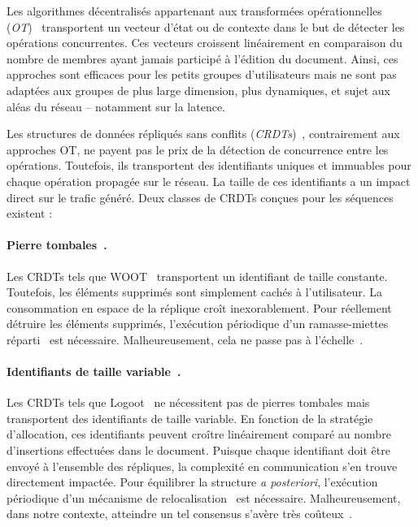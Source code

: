 Les algorithmes décentralisés appartenant aux transformées opérationnelles
(\emph{OT})~\cite{sun1998operational, sun2009contextbased} transportent un
vecteur d'état ou de contexte dans le but de détecter les opérations
concurrentes. Ces vecteurs croissent linéairement en comparaison du nombre de
membres ayant jamais participé à l'édition du document. Ainsi, ces approches
sont efficaces pour les petits groupes d'utilisateurs mais ne sont pas adaptées
aux groupes de plus large dimension, plus dynamiques, et sujet aux aléas du
réseau -- notamment sur la latence.

Les structures de données répliqués sans conflits
(\emph{CRDTs})~\cite{burckhardt2014replicated, shapiro2011comprehensive,
shapiro2011conflict}, contrairement aux approches OT, ne payent pas le prix de
la détection de concurrence entre les opérations. Toutefois, ils transportent
des identifiants uniques et immuables pour chaque opération propagée sur le
réseau. La taille de ces identifiants a un impact direct sur le trafic généré.
Deux classes de CRDTs conçues pour les séquences existent :

\paragraph{Pierre tombales~\cite{ahmed2011evaluating, attiya2016specification,
conway2014language, grishchenko2010deep, oster2006data, roh2011replicated,
weiss2007wooki, wu2010partial, yu2012stringwise}.} Les CRDTs tels que
WOOT~\cite{oster2006data} transportent un identifiant de taille constante.  
Toutefois, les éléments supprimés sont simplement cachés à l'utilisateur. La
consommation en espace de la réplique croît inexorablement. 
Pour réellement détruire les éléments supprimés, l'exécution périodique d'un
ramasse-miettes réparti~\cite{abdullahi1998garbage} est
nécessaire. Malheureusement, cela ne passe pas à
l'échelle~\cite{abdullahi1998garbage}.

\paragraph{Identifiants de taille variable~\cite{andre2013supporting,
 preguica2009commutative, weiss2009logoot}.} Les CRDTs tels que
Logoot~\cite{weiss2009logoot} ne nécessitent pas de pierres tombales mais
transportent des identifiants de taille variable. En fonction de la stratégie
d'allocation, ces identifiants peuvent croître linéairement comparé au nombre
d'insertions effectuées dans le document. Puisque chaque identifiant doit être
envoyé à l'ensemble des répliques, la complexité en communication s'en trouve
directement impactée. Pour équilibrer la structure \emph{a posteriori},
l'exécution périodique d'un mécanisme de relocalisation~\cite{letia2009crdts}
est nécessaire. Malheureusement, dans notre contexte, atteindre un tel consensus
s'avère très coûteux~\cite{mostefaoui2015signature}.


